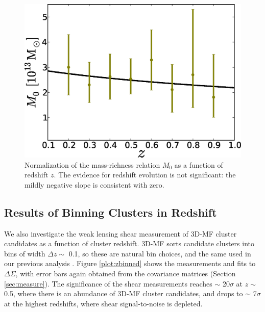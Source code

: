 \begin{figure}
\begin{center}
  \includegraphics[scale=0.7]{plots_ch4/Mo_vs_z_DuttonMaccio_powerlaw.eps}
  \caption[Redshift Dependence of Mass-Richness Normalization]{Normalization of the mass-richness relation $M_0$ as a function of redshift $z$. The evidence for redshift evolution is not significant: the mildly negative slope is consistent with zero.}
\label{plot:MoVSz} %
\end{center}
\end{figure}

\subsection{Results of Binning Clusters in Redshift}
We also investigate the weak lensing shear measurement of \ac{3D-MF} cluster candidates as a function of cluster redshift. \ac{3D-MF} sorts candidate clusters into bins of width $\Delta z \sim$ 0.1, so these are natural bin choices, and the same used in our previous analysis \citep{Ford14}. Figure \ref{plot:zbinned} shows the measurements and fits to $\Delta \Sigma$, with error bars again obtained from the covariance matrices (Section \ref{sec:measure}). The significance of the shear measurements reaches $\sim$ 20$\sigma$ at $z \sim$ 0.5, where there is an abundance of \ac{3D-MF} cluster candidates, and drops to $\sim$ 7$\sigma$ at the highest redshifts, where shear signal-to-noise is depleted. 

